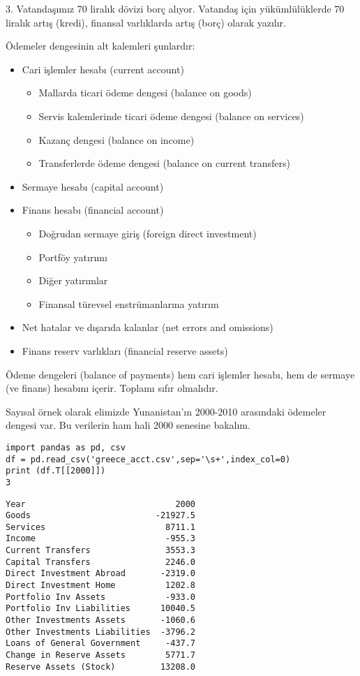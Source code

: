 \documentclass[12pt,fleqn]{article}\usepackage{../../common}
\begin{document}
3. Vatandaşımız 70 liralık dövizi borç alıyor. Vatandaş için yükümlülüklerde
70 liralık artış (kredi), finansal varlıklarda artış (borç) olarak yazılır.

Ödemeler dengesinin alt kalemleri şunlardır:

\begin{itemize}
   \item Cari işlemler hesabı (current account)     
   \begin{itemize}
     \item Mallarda ticari ödeme dengesi (balance on goods)
     \item Servis kalemlerinde ticari ödeme dengesi (balance on services)
     \item Kazanç dengesi (balance on income)
     \item Transferlerde ödeme dengesi (balance on current transfers)
   \end{itemize}
   \item Sermaye hesabı (capital account)
   \item Finans hesabı (financial account)
   \begin{itemize}
     \item Doğrudan sermaye giriş (foreign direct investment)
     \item Portföy yatırımı
     \item Diğer yatırımlar
     \item Finansal türevsel enstrümanlarına yatırım
   \end{itemize}     
   \item Net hatalar ve dışarıda kalanlar (net errors and omissions)
   \item Finans reserv varlıkları (financial reserve assets)
\end{itemize}

Ödeme dengeleri (balance of payments) hem cari işlemler hesabı, hem de
sermaye (ve finans) hesabını içerir. Toplamı sıfır olmalıdır. 

Sayısal örnek olarak elimizde Yunanistan'ın 2000-2010 arasındaki ödemeler
dengesi var. Bu verilerin ham hali 2000 senesine bakalım. 

\begin{verbatim}
import pandas as pd, csv
df = pd.read_csv('greece_acct.csv',sep='\s+',index_col=0)
print (df.T[[2000]])
3\end{verbatim}

\begin{verbatim}
Year                              2000
Goods                         -21927.5
Services                        8711.1
Income                          -955.3
Current Transfers               3553.3
Capital Transfers               2246.0
Direct Investment Abroad       -2319.0
Direct Investment Home          1202.8
Portfolio Inv Assets            -933.0
Portfolio Inv Liabilities      10040.5
Other Investments Assets       -1060.6
Other Investments Liabilities  -3796.2
Loans of General Government     -437.7
Change in Reserve Assets        5771.7
Reserve Assets (Stock)         13208.0
\end{verbatim}
\end{document}
